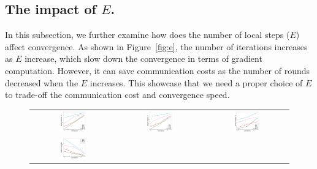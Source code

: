 \subsection{The impact of $E$.}
In this subsection, we further examine how does the number of local steps ($E$) 
affect convergence. As shown in Figure~\ref{fig:e}, the number of iterations increases as $E$ increase, which slow down the convergence in
terms of gradient computation. However, it can save communication costs as
the number of rounds decreased when the $E$ increases. This showcase that
we need a proper choice of $E$ to trade-off the communication cost and
convergence speed. 
\begin{figure}
\centering
	\begin{tabular}{ccc}
	\hspace{-2em} \includegraphics[width=0.33\textwidth]{fig/paper-stronglycvxsmthspeedupEpochsT-min-w8a-epsilon0131-reg1e-05.pdf} &
	\includegraphics[width=0.33\textwidth]{fig/paper-cvxsmoothspeedupEpochsT-min-w8a-epsilon0134-reg0.pdf} & 
	\includegraphics[width=0.33\textwidth]{fig/paper-linregression-newspeedupEpochsT-min-linearregressionw8a-epsilon002-reg0.pdf} \\
	\hspace{-2em} \includegraphics[width=0.33\textwidth]{fig/paper-stronglycvxsmthspeedupEpochsRounds-min-w8a-epsilon0131-reg1e-05.pdf} &

\end{tabular}
\end{figure}

